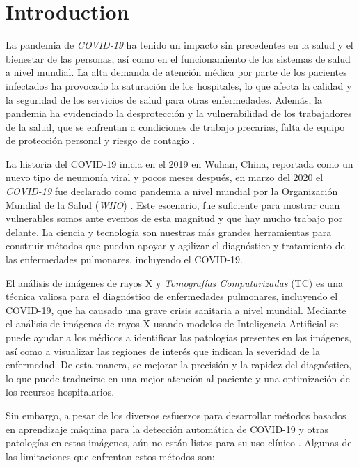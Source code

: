 \chapter{Introduction}
La pandemia de \textit{COVID-19} ha tenido un impacto sin precedentes en la salud y el bienestar de las
personas, así como en el funcionamiento de los sistemas de salud a nivel mundial. La alta demanda
de atención médica por parte de los pacientes infectados ha provocado la saturación de los hospitales,
lo que afecta la calidad y la seguridad de los servicios de salud para otras enfermedades.
Además, la pandemia ha evidenciado la desprotección y la vulnerabilidad de los trabajadores de la
salud, que se enfrentan a condiciones de trabajo precarias, falta de equipo de protección personal
y riesgo de contagio \cite{demanda-hospital-mexico}.


La historia del COVID-19 inicia en el 2019 en Wuhan, China, reportada como un nuevo tipo de neumonía
viral \cite{huang2020clinical} y pocos meses después, en marzo del 2020 el \textit{COVID-19} fue
declarado como pandemia a nivel mundial por la Organización Mundial de la Salud (\textit{WHO})
\cite{world2020director}. Este escenario, fue suficiente para mostrar cuan vulnerables somos ante
eventos de esta magnitud y que hay mucho trabajo por delante. La ciencia y tecnología son nuestras
más grandes herramientas para construir  métodos que puedan apoyar y agilizar el diagnóstico y
tratamiento de las enfermedades pulmonares, incluyendo el COVID-19.

El análisis de imágenes de rayos X y \textit{Tomografías Computarizadas} (TC) es una técnica valiosa
para el diagnóstico de enfermedades pulmonares, incluyendo el COVID-19, que ha causado una grave
crisis sanitaria a nivel mundial. Mediante el análisis de imágenes de rayos X usando modelos de
Inteligencia Artificial se puede ayudar a los médicos a identificar las patologías presentes en las
imágenes, así como a visualizar las regiones de interés que indican la severidad de la enfermedad.
De esta manera, se mejorar la precisión y la rapidez del diagnóstico, lo que puede traducirse en una
mejor atención al paciente y una optimización de los recursos hospitalarios.

Sin embargo, a pesar de los diversos esfuerzos para desarrollar
métodos basados en aprendizaje máquina para la detección automática de COVID-19 y otras patologías
en estas imágenes, aún no están listos para su uso clínico \cite{roberts2021common}. Algunas de las
limitaciones que enfrentan estos métodos son:


